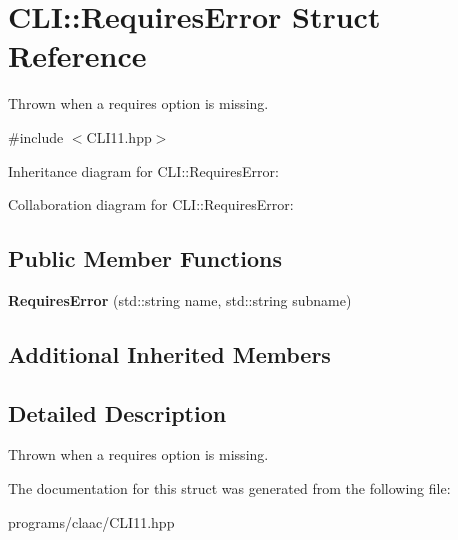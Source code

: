 \hypertarget{struct_c_l_i_1_1_requires_error}{}\section{C\+LI\+:\+:Requires\+Error Struct Reference}
\label{struct_c_l_i_1_1_requires_error}


Thrown when a requires option is missing.  




{\ttfamily \#include $<$C\+L\+I11.\+hpp$>$}



Inheritance diagram for C\+LI\+:\+:Requires\+Error\+:


Collaboration diagram for C\+LI\+:\+:Requires\+Error\+:
\subsection*{Public Member Functions}
\begin{DoxyCompactItemize}
\item 
\mbox{\label{struct_c_l_i_1_1_requires_error_afb74d006a67ea1e3ef2a3a400d64517b}} 
{\bfseries Requires\+Error} (std\+::string name, std\+::string subname)
\end{DoxyCompactItemize}
\subsection*{Additional Inherited Members}


\subsection{Detailed Description}
Thrown when a requires option is missing. 

The documentation for this struct was generated from the following file\+:\begin{DoxyCompactItemize}
\item 
programs/claac/C\+L\+I11.\+hpp\end{DoxyCompactItemize}
